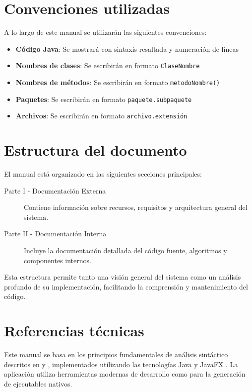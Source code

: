 \section{Convenciones utilizadas}

A lo largo de este manual se utilizarán las siguientes convenciones:

\begin{itemize}
    \item \textbf{Código Java}: Se mostrará con sintaxis resaltada y numeración de líneas
    \item \textbf{Nombres de clases}: Se escribirán en formato \texttt{ClaseNombre}
    \item \textbf{Nombres de métodos}: Se escribirán en formato \texttt{metodoNombre()}
    \item \textbf{Paquetes}: Se escribirán en formato \texttt{paquete.subpaquete}
    \item \textbf{Archivos}: Se escribirán en formato \texttt{archivo.extensión}
\end{itemize}

\section{Estructura del documento}

El manual está organizado en las siguientes secciones principales:

\begin{description}
    \item[Parte I - Documentación Externa] Contiene información sobre recursos, requisitos y arquitectura general del sistema.
    \item[Parte II - Documentación Interna] Incluye la documentación detallada del código fuente, algoritmos y componentes internos.
\end{description}

Esta estructura permite tanto una visión general del sistema como un análisis profundo de su implementación, facilitando la comprensión y mantenimiento del código.

\section{Referencias técnicas}

Este manual se basa en los principios fundamentales de análisis sintáctico descritos en \cite{aho2006compilers} y \cite{hopcroft2006introduction}, implementados utilizando las tecnologías Java \cite{java} y JavaFX \cite{javafx}. La aplicación utiliza herramientas modernas de desarrollo como \cite{jpackage} para la generación de ejecutables nativos.